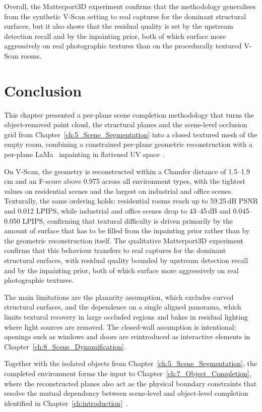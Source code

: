 Overall, the Matterport3D experiment confirms that the methodology generalises from the synthetic V-Scan setting to real captures for the dominant structural surfaces, but it also shows that the residual quality is set by the upstream detection recall and by the inpainting prior, both of which surface more aggressively on real photographic textures than on the procedurally textured V-Scan rooms.


\section{Conclusion}
\label{sec:6_conclusion}
 
This chapter presented a per-plane scene completion methodology that turns the object-removed point cloud, the structural planes and the scene-level occlusion grid from Chapter~\ref{ch:5_Scene_Segmentation} into a closed textured mesh of the empty room, combining a constrained per-plane geometric reconstruction with a per-plane LaMa~\cite{suvorov_resolution-robust_2022} inpainting in flattened UV space~\cite{vermandere_semantic_2024}.
 
On V-Scan, the geometry is reconstructed within a Chamfer distance of 1.5--1.9\,cm and an F-score above 0.975 across all environment types, with the tightest values on residential scenes and the largest on industrial and office scenes. Texturally, the same ordering holds: residential rooms reach up to 59.25\,dB PSNR and 0.012 LPIPS, while industrial and office scenes drop to 43--45\,dB and 0.045--0.050 LPIPS, confirming that textural difficulty is driven primarily by the amount of surface that has to be filled from the inpainting prior rather than by the geometric reconstruction itself. The qualitative Matterport3D experiment confirms that this behaviour transfers to real captures for the dominant structural surfaces, with residual quality bounded by upstream detection recall and by the inpainting prior, both of which surface more aggressively on real photographic textures.
 
The main limitations are the planarity assumption, which excludes curved structural surfaces, and the dependence on a single aligned panorama, which limits textural recovery in large occluded regions and bakes in residual lighting where light sources are removed. The closed-wall assumption is intentional: openings such as windows and doors are reintroduced as interactive elements in Chapter~\ref{ch:8_Scene_Dynamification}.
 
Together with the isolated objects from Chapter~\ref{ch:5_Scene_Segmentation}, the completed environment forms the input to Chapter~\ref{ch:7_Object_Completion}, where the reconstructed planes also act as the physical boundary constraints that resolve the mutual dependency between scene-level and object-level completion identified in Chapter~\ref{ch:introduction}~\cite{vermandere_guided_2025}.
 


\cleardoublepage